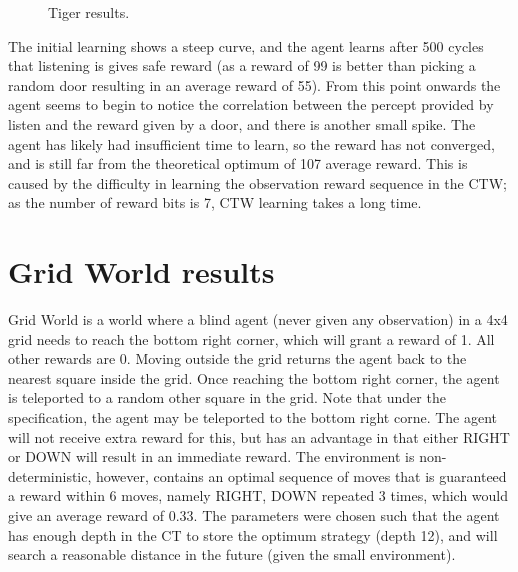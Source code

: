 \documentclass[pdftex,twoside,a4paper]{report}
\begin{document}
 \begin{figure}[h]
   \begin{center}
   \end{center}
   \caption{Tiger results.}
   \label{fig:tiger_results}
 \end{figure}

The initial learning shows a steep curve, and the agent learns after 500 cycles that listening is gives safe reward (as a reward of 99 is better than picking a random door resulting in an average reward of 55). From this point onwards the agent seems to begin to notice the correlation between the percept provided by listen and the reward given by a door, and there is another small spike. The agent has likely had insufficient time to learn, so the reward has not converged, and is still far from the theoretical optimum of 107 average reward. This is caused by the difficulty in learning the observation reward sequence in the CTW; as the number of reward bits is 7, CTW learning takes a long time.

\section{Grid World results}
Grid World is a world where a blind agent (never given any observation) in a 4x4 grid needs to reach the bottom right corner, which will grant a reward of 1. All other rewards are 0. Moving outside the grid returns the agent back to the nearest square inside the grid. Once reaching the bottom right corner, the agent is teleported to a random other square in the grid. Note that under the specification, the agent may be teleported to the bottom right corne. The agent will not receive extra reward for this, but has an advantage in that either RIGHT or DOWN will result in an immediate reward. The environment is non-deterministic, however, contains an optimal sequence of moves that is guaranteed a reward within 6 moves, namely RIGHT, DOWN repeated 3 times, which would give an average reward of 0.33. The parameters were chosen such that the agent has enough depth in the CT to store the optimum strategy (depth 12), and will search a reasonable distance in the future (given the small environment).
\end{document}
